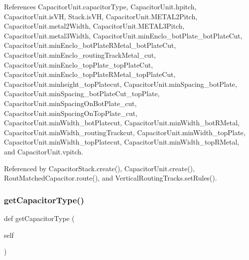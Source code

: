References Capacitor\+Unit.\+capacitor\+Type, Capacitor\+Unit.\+hpitch, Capacitor\+Unit.\+is\+VH, Stack.\+is\+VH, Capacitor\+Unit.\+M\+E\+T\+A\+L2\+Pitch, Capacitor\+Unit.\+metal2\+Width, Capacitor\+Unit.\+M\+E\+T\+A\+L3\+Pitch, Capacitor\+Unit.\+metal3\+Width, Capacitor\+Unit.\+min\+Enclo\+\_\+bot\+Plate\+\_\+bot\+Plate\+Cut, Capacitor\+Unit.\+min\+Enclo\+\_\+bot\+Plate\+R\+Metal\+\_\+bot\+Plate\+Cut, Capacitor\+Unit.\+min\+Enclo\+\_\+routing\+Track\+Metal\+\_\+cut, Capacitor\+Unit.\+min\+Enclo\+\_\+top\+Plate\+\_\+top\+Plate\+Cut, Capacitor\+Unit.\+min\+Enclo\+\_\+top\+Plate\+R\+Metal\+\_\+top\+Plate\+Cut, Capacitor\+Unit.\+minheight\+\_\+top\+Platecut, Capacitor\+Unit.\+min\+Spacing\+\_\+bot\+Plate, Capacitor\+Unit.\+min\+Spacing\+\_\+bot\+Plate\+Cut\+\_\+top\+Plate, Capacitor\+Unit.\+min\+Spacing\+On\+Bot\+Plate\+\_\+cut, Capacitor\+Unit.\+min\+Spacing\+On\+Top\+Plate\+\_\+cut, Capacitor\+Unit.\+min\+Width\+\_\+bot\+Platecut, Capacitor\+Unit.\+min\+Width\+\_\+bot\+R\+Metal, Capacitor\+Unit.\+min\+Width\+\_\+routing\+Trackcut, Capacitor\+Unit.\+min\+Width\+\_\+top\+Plate, Capacitor\+Unit.\+min\+Width\+\_\+top\+Platecut, Capacitor\+Unit.\+min\+Width\+\_\+top\+R\+Metal, and Capacitor\+Unit.\+vpitch.



Referenced by Capacitor\+Stack.\+create(), Capacitor\+Unit.\+create(), Rout\+Matched\+Capacitor.\+route(), and Vertical\+Routing\+Tracks.\+set\+Rules().

\mbox{\label{classpython_1_1capacitorunit_1_1CapacitorUnit_a826bc534525cb9da119bf5e53393c4e8}} 
\subsubsection{\texorpdfstring{get\+Capacitor\+Type()}{getCapacitorType()}}
{\footnotesize\ttfamily def get\+Capacitor\+Type (\begin{DoxyParamCaption}\item[{}]{self }\end{DoxyParamCaption})}

